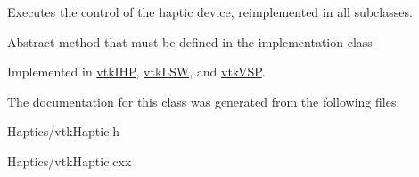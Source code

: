 Executes the control of the haptic device, reimplemented in all subclasses. 

Abstract method that must be defined in the implementation class 

Implemented in \hyperlink{classvtkIHP_a0777ce95f933e80ccfb47f4ebadcf1ec}{vtkIHP}, \hyperlink{classvtkLSW_ade67f3385b72c50988016692a03e97ae}{vtkLSW}, and \hyperlink{classvtkVSP_a84afcaaf6dab2a0fe19b7021e44796e7}{vtkVSP}.



The documentation for this class was generated from the following files:\begin{DoxyCompactItemize}
\item 
Haptics/vtkHaptic.h\item 
Haptics/vtkHaptic.cxx\end{DoxyCompactItemize}
